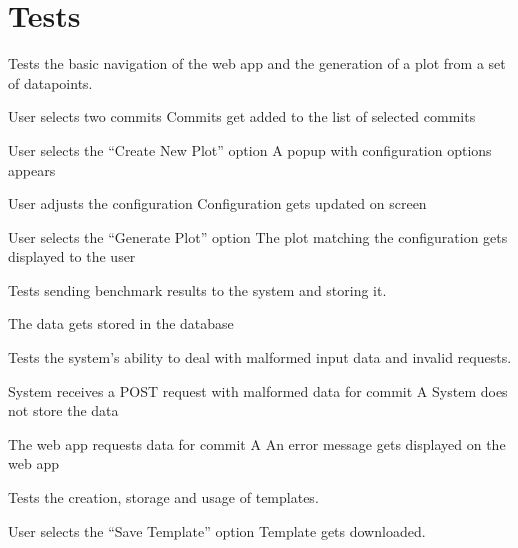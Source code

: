 \section{Tests}


Tests the basic navigation of the web app and the generation of a \gls{plot} from a set of datapoints.

{User selects two commits}
{Commits get added to the list of selected commits}

{User selects the \enquote{Create New Plot} option}
{A popup with configuration options appears}

{User adjusts the configuration}
{Configuration gets updated on screen}

{User selects the \enquote{Generate Plot} option}
{The \gls{plot} matching the configuration gets displayed to the user}


Tests sending \glspl{benchmark result} to the system and storing it.

{The data gets stored in the database}


Tests the system's ability to deal with malformed input data and invalid requests.

{System receives a POST request with malformed data for commit A}
{System does not store the data}

{The web app requests data for commit A}
{An error message gets displayed on the web app}


Tests the creation, storage and usage of \glspl{template}.

{User selects the \enquote{Save Template} option}
{Template gets downloaded.}


